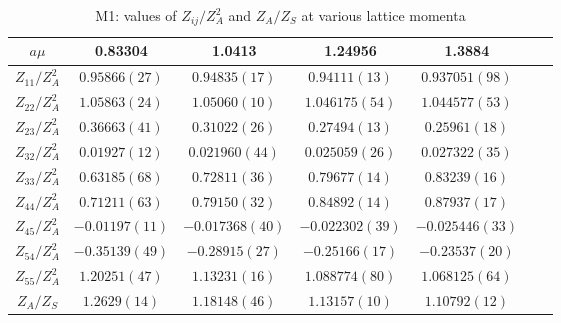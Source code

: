 \begin{table}
\begin{center}
\caption{\label{tab:M1renormvals}M1: values of $Z_{ij}/Z_A^2$ and $Z_A/Z_S$ at various lattice momenta}
\begin{tabular}{c|c c c c c c}
\hline
\hline
$a\mu$ & 0.83304 & 1.0413 & 1.24956 & 1.3884 \\
\hline
$Z_{11}/Z_A^2$ & $0.95866(27)$ & $0.94835(17)$ & $0.94111(13)$ & $0.937051(98)$ \\
\hline
$Z_{22}/Z_A^2$ & $1.05863(24)$ & $1.05060(10)$ & $1.046175(54)$ & $1.044577(53)$ \\
$Z_{23}/Z_A^2$ & $0.36663(41)$ & $0.31022(26)$ & $0.27494(13)$ & $0.25961(18)$ \\
$Z_{32}/Z_A^2$ & $0.01927(12)$ & $0.021960(44)$ & $0.025059(26)$ & $0.027322(35)$ \\
$Z_{33}/Z_A^2$ & $0.63185(68)$ & $0.72811(36)$ & $0.79677(14)$ & $0.83239(16)$ \\
\hline
$Z_{44}/Z_A^2$ & $0.71211(63)$ & $0.79150(32)$ & $0.84892(14)$ & $0.87937(17)$ \\
$Z_{45}/Z_A^2$ & $-0.01197(11)$ & $-0.017368(40)$ & $-0.022302(39)$ & $-0.025446(33)$ \\
$Z_{54}/Z_A^2$ & $-0.35139(49)$ & $-0.28915(27)$ & $-0.25166(17)$ & $-0.23537(20)$ \\
$Z_{55}/Z_A^2$ & $1.20251(47)$ & $1.13231(16)$ & $1.088774(80)$ & $1.068125(64)$ \\
\hline
$Z_A/Z_S$ & $1.2629(14)$ & $1.18148(46)$ & $1.13157(10)$ & $1.10792(12)$ \\
\hline
\hline
\end{tabular}
\end{center}
\end{table}
